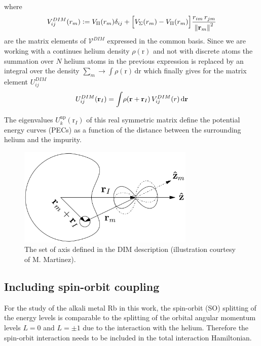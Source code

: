 \documentclass[12pt,a4paper,twosides]{book}
\renewcommand{\vec}[1]{\bm{\mathrm{#1}}}
\newcommand{\diff}[1]{\,\mathrm{d}{\vec{#1}}}
\begin{document}
			where
			\begin{align}
				V^{DIM}_{ij}(r_m) \vcentcolon= V_\Pi(r_m)\delta_{ij}+\qty\Big[V_\Sigma(r_m)-V_\Pi(r_m)]\frac{r_{im}\,r_{jm}}{\norm{\vec{r}_m}^2} \label{eq:vdim}
			\end{align}
			are the matrix elements of $\mathcal{V}^{DIM}$ expressed in the common basis. Since we are working with a continues helium density $\rho(\vec{r})$ and not with discrete atoms the summation over $N$ helium atoms in the previous expression is replaced by an integral over the density $\sum_m\rightarrow\int\!\rho(\vec{r})\diff{r}$ which finally gives for the matrix element $U^{DIM}_{ij}$
			\begin{align}
				U^{DIM}_{ij}(\vec{r}_I) = \int\! \rho\qty(\vec{r}+\vec{r}_I)\,V^{DIM}_{ij}(r)\diff{r} \label{eq:u-dim}
			\end{align}
			
			The eigenvalues $U^{\mathrm{np}}_k(\vec{r}_I)$ of this real symmetric matrix define the potential energy curves (PECs) as a function of the distance between the surrounding helium and the impurity.
			\begin{figure}[t]
				\begin{center}
					\includegraphics[width=0.75\textwidth]{dim-axes}
				\end{center}
				\caption{The set of axis defined in the DIM description (illustration courtesy of M. Martinez).}
				\label{fig:dim-axes}
			\end{figure}			
		
		\subsection{Including spin-orbit coupling}
			For the study of the alkali metal Rb in this work, the spin-orbit (SO) splitting of the energy levels is comparable to the splitting of the orbital angular momentum levels $L=0$ and $L=\pm 1$ due to the interaction with the helium. Therefore the spin-orbit interaction needs to be included in the total interaction Hamiltonian.\\
			
\end{document}
